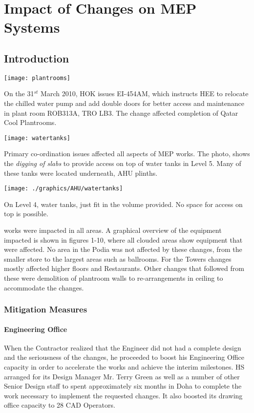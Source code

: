 \chapter{Impact of Changes on MEP Systems}
\section{Introduction  \label{HVAC}}
\begin{marginfigure}%
  \texttt{[image: plantrooms]}
  \caption{On the 31$^{st}$ March 2010, HOK issues EI-454AM, which instructs HEE to relocate the chilled water
pump and add double doors for better access and maintenance in plant
room ROB313A, TRO LB3. The change affected completion of Qatar Cool Plantrooms.}
  \label{fig:marginfig1}
\end{marginfigure}
\begin{marginfigure}%
  \texttt{[image: watertanks]}
  \caption{Primary co-ordination issues affected all aspects of MEP works. The photo, shows the \textit{digging of slabs} to provide access on top of water tanks in Level 5. Many of these tanks were located underneath, AHU plinths.}
  \label{fig:marginfig1}
\end{marginfigure}
\begin{marginfigure}%
 \texttt{[image: ./graphics/AHU/watertanks]}
  \caption{On Level 4, water tanks, just fit in the volume provided. No space for access on top is possible. }
  \label{fig:marginfig1}
\end{marginfigure}

 works were impacted in all areas. A graphical overview of the equipment impacted is shown in figures 1-10, where all clouded areas show equipment that were affected. No area in the Podia was not affected by these changes, from the smaller store to the largest areas such as ballrooms. For the Towers changes mostly affected higher floors and Restaurants. Other changes that followed from these were demolition of plantroom walls to re-arrangements in ceiling to accommodate the changes.

\subsection{Mitigation Measures} 

\subsubsection{Engineering Office}
When the Contractor realized that the Engineer did not had a complete design and the seriousness of the changes, he proceeded to boost his Engineering Office capacity in order to accelerate the works and achieve the interim milestones. HS arranged for its Design Manager Mr. Terry Green as well as a number of other Senior Design staff to spent approximately six months in Doha to complete the work necessary to implement the requested changes. It also boosted its drawing office capacity to 28 CAD Operators. 


